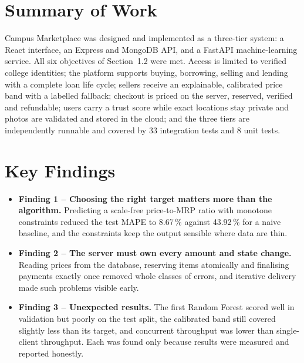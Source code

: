 \documentclass[12pt,letterpaper,twoside,openany]{report}
\begin{document}
\section{Summary of Work}
Campus Marketplace was designed and implemented as a three-tier system: a React interface, an Express and
MongoDB API, and a FastAPI machine-learning service. All six objectives of Section~1.2 were met. Access is
limited to verified college identities; the platform supports buying, borrowing, selling and lending with a
complete loan life cycle; sellers receive an explainable, calibrated price band with a labelled fallback;
checkout is priced on the server, reserved, verified and refundable; users carry a trust score while exact
locations stay private and photos are validated and stored in the cloud; and the three tiers are
independently runnable and covered by 33 integration tests and 8 unit tests.

\section{Key Findings}
\begin{itemize}
  \item \textbf{Finding 1 -- Choosing the right target matters more than the algorithm.} Predicting a
        scale-free price-to-MRP ratio with monotone constraints reduced the test MAPE to 8.67\,\% against
        43.92\,\% for a naive baseline, and the constraints keep the output sensible where data are thin.
  \item \textbf{Finding 2 -- The server must own every amount and state change.} Reading prices from the
        database, reserving items atomically and finalising payments exactly once removed whole classes of
        errors, and iterative delivery made such problems visible early.
  \item \textbf{Finding 3 -- Unexpected results.} The first Random Forest scored well in validation but
        poorly on the test split, the calibrated band still covered slightly less than its target, and
        concurrent throughput was lower than single-client throughput. Each was found only because results
        were measured and reported honestly.
\end{itemize}
\end{document}
